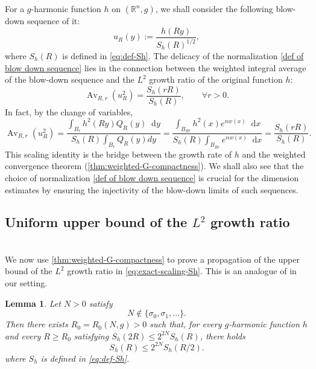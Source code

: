 \documentclass[12pt]{amsart}
\theoremstyle{plain}
\newtheorem{lemma}[theorem]{Lemma}
\theoremstyle{definition}
\theoremstyle{remark}     %
\numberwithin{equation}{section}
\newcommand{\dd}{\mathop{}\!\mathrm{d}}%
\begin{document}
For a $g$-harmonic function $h$ on $(\mathbb{R}^n,g)$, we shall consider the following blow-down sequence of it:
\begin{equation}\label{def of blow down sequence}
    u_R(y):=\frac{h(Ry)}{S_h(R)^{1/2}},
\end{equation}
where $S_h(R)$ is defined in \cref{eq:def-Sh}.
{The delicacy of the normalization \cref{def of blow down sequence} lies in the connection between the weighted integral average of the blow-down sequence and  the $L^2$ growth ratio of the original function $h$:
}
\begin{equation}\label{eq:exact-scaling-Sh}
    \operatorname{Av}_{R,r}(u_R^2)
    =\frac{S_h(rR)}{S_h(R)},
    \qquad \forall r>0.
\end{equation}
In fact, by the change of variables,
\[
    \operatorname{Av}_{R,r}(u_R^2)
    =\frac{\int_{B_r}h^2(Ry) Q_R(y)\dd y}{S_h(R)\int_{B_r}Q_R(y)dy}
    =\frac{\int_{B_{Rr}}h^2(x)e^{nw(x)}\dd x}
    {S_h(R)\int_{B_{Rr}}e^{nw(x)}\dd x}
    =\frac{S_h(rR)}{S_h(R)}.
\]
{
This scaling identity is the bridge between the growth rate of $h$ and the
weighted convergence theorem (\cref{thm:weighted-G-compactness}).
We shall also see that the choice of normalization \cref{def of blow down sequence} is crucial for the dimension estimates by ensuring the injectivity of the blow-down limits of such sequences.
}



\subsection{Uniform upper bound of the $L^2$ growth ratio}
\ \\
We now use \cref{thm:weighted-G-compactness} to prove a propagation of the upper bound of the $L^2$ growth ratio in \cref{eq:exact-scaling-Sh}. This is an analogue of \cite[(2.15)]{L} in our setting.
\begin{lemma}
\label{prop:one-step-doubling}
Let $N>0$ satisfy
\[
    N\notin\{\sigma_0,\sigma_1,\ldots\}.
\]
Then there exists $R_0=R_0(N,g)>0$ such that, for every $g$-harmonic function
$h$ and every $R\geq R_0$ satisfying $ S_h(2R)\leq2^{2N}S_h(R)$, there holds
\[
    S_h(R)\leq2^{2N}S_h(R/2).
\]
where $S_h$ is defined in \cref{eq:def-Sh}.
\end{lemma}
\end{document}
